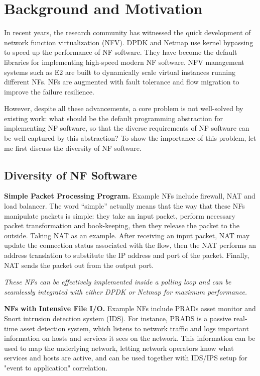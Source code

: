 \section{Background and Motivation}

In recent years, the research community has witnessed the quick development of
network function virtualization (NFV). DPDK \cite{dpdk} and Netmap
\cite{rizzo2012netmap} use kernel bypassing to speed up the performance of NF
software. They have become the default libraries for implementing high-speed
modern NF software. NFV management systems such as E2 \cite{palkar2015e2} are
built to dynamically scale virtual instances running different NFs. NFs are
augmented with fault tolerance \cite{sherry2015rollback} and flow migration
\cite{gember2014opennf} to improve the failure resilience.

However, despite all these advancements, a core problem is not well-solved by
existing work: what should be the default programming abstraction for implementing NF
software, so that the diverse requirements of NF software can be well-captured
by this abstraction? To show the importance of this problem, let me first discuss
the diversity of NF software.

\subsection{Diversity of NF Software}


\noindent \textbf{Simple Packet Processing Program.} Example NFs include
firewall, NAT and load balancer. The word ``simple'' actually means that the way
that these NFs manipulate packets is simple: they take an input packet,
perform necessary packet transformation and book-keeping, then they release the
packet to the outside. Taking NAT as an example. After receiving an input
packet, NAT may update the connection status associated with the flow, then the
NAT performs an address translation to substitute the IP address and port of the
packet. Finally, NAT sends the packet out from the output port.

\textit{These NFs can be effectively implemented inside a polling loop and can be
seamlessly integrated with either DPDK or Netmap for maximum performance.}

\noindent \textbf{NFs with Intensive File I/O.} Example NFs include PRADs
\cite{prads} asset monitor and Snort \cite{snort} intrusion detection system
(IDS). For instance, PRADS is a passive real-time asset detection system, which
listens to network traffic and logs important information on hosts and services
it sees on the network. This information can be used to map the underlying
network, letting network operators know what services and hosts are active, and
can be used together with IDS/IPS setup for "event to application" correlation.

